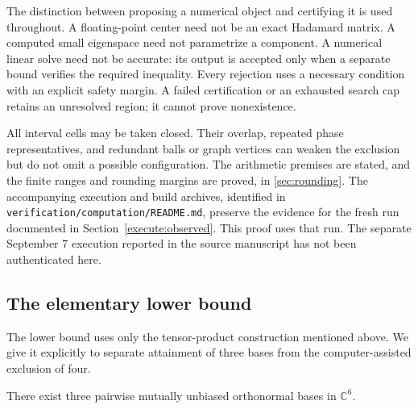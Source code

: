 

The distinction between proposing a numerical object and certifying it
is used throughout. A floating-point center need not be an exact
Hadamard matrix. A computed small eigenspace need not parametrize a
component. A numerical linear solve need not be accurate: its output
is accepted only when a separate bound verifies the required
inequality. Every rejection uses a necessary condition with an
explicit safety margin. A failed certification or an exhausted search
cap retains an unresolved region; it cannot prove nonexistence.

All interval cells may be taken closed. Their overlap, repeated phase
representatives, and redundant balls or graph vertices can weaken the
exclusion but do not omit a possible configuration. The arithmetic
premises are stated, and the finite ranges and rounding margins are
proved, in \cref{sec:rounding}. The accompanying execution and build archives,
identified in \texttt{verification/computation/README.md}, preserve the evidence for
the fresh run documented in Section~\ref{execute:observed}. This proof
uses that run. The separate September 7 execution reported in the source
manuscript has not been authenticated here.

\subsection{The elementary lower bound}

The lower bound uses only the tensor-product construction mentioned
above. We give it explicitly to separate attainment of three bases from
the computer-assisted exclusion of four.

\begin{lemma}
\label{lem:three-mub-six}
There exist three pairwise mutually unbiased orthonormal bases in
$\mathbb C^6$.
\end{lemma}


